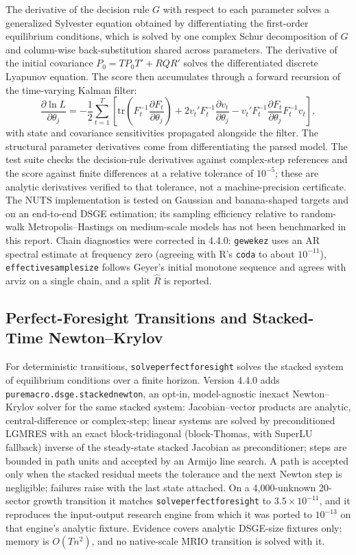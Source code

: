 \documentclass[11pt,letterpaper]{article}
\renewcommand{\_}{\pmunderscore\allowbreak}
\begin{document}
The derivative of the decision rule \(G\) with respect to each parameter solves a generalized Sylvester equation obtained by differentiating the first-order equilibrium conditions, which is solved by one complex Schur decomposition of \(G\) and column-wise back-substitution shared across parameters. The derivative of the initial covariance \(P_0 = T P_0 T' + R Q R'\) solves the differentiated discrete Lyapunov equation. The score then accumulates through a forward recursion of the time-varying Kalman filter:
\[\frac{\partial \ln L}{\partial \theta_j} = -\frac{1}{2} \sum_{t=1}^T \left[ \text{tr}\left( F_t^{-1} \frac{\partial F_t}{\partial \theta_j} \right) + 2 v_t' F_t^{-1} \frac{\partial v_t}{\partial \theta_j} - v_t' F_t^{-1} \frac{\partial F_t}{\partial \theta_j} F_t^{-1} v_t \right],\]
with state and covariance sensitivities propagated alongside the filter. The structural parameter derivatives come from differentiating the parsed model. The test suite checks the decision-rule derivatives against complex-step references and the score against finite differences at a relative tolerance of \(10^{-5}\); these are analytic derivatives verified to that tolerance, not a machine-precision certificate. The NUTS implementation is tested on Gaussian and banana-shaped targets and on an end-to-end DSGE estimation; its sampling efficiency relative to random-walk Metropolis--Hastings on medium-scale models has not been benchmarked in this report. Chain diagnostics were corrected in 4.4.0: \texttt{geweke\_z} uses an AR spectral estimate at frequency zero (agreeing with R's \texttt{coda} to about \(10^{-11}\)), \texttt{effective\_sample\_size} follows Geyer's initial monotone sequence and agrees with arviz on a single chain, and a split \(\hat R\) is reported.

\subsection{Perfect-Foresight Transitions and Stacked-Time Newton--Krylov}\label{perfect-foresight-transitions-and-stacked-time-newtonkrylov}

For deterministic transitions, \texttt{solve\_perfect\_foresight} solves the stacked system of equilibrium conditions over a finite horizon. Version 4.4.0 adds \texttt{puremacro.dsge.stacked\_newton}, an opt-in, model-agnostic inexact Newton--Krylov solver for the same stacked system: Jacobian--vector products are analytic, central-difference or complex-step; linear systems are solved by preconditioned LGMRES with an exact block-tridiagonal (block-Thomas, with SuperLU fallback) inverse of the steady-state stacked Jacobian as preconditioner; steps are bounded in path units and accepted by an Armijo line search. A path is accepted only when the stacked residual meets the tolerance and the next Newton step is negligible; failures raise with the last state attached. On a 4,000-unknown 20-sector growth transition it matches \texttt{solve\_perfect\_foresight} to \(3.5\times10^{-11}\), and it reproduces the input-output research engine from which it was ported to \(10^{-13}\) on that engine's analytic fixture. Evidence covers analytic DSGE-size fixtures only; memory is \(O(T n^2)\), and no native-scale MRIO transition is solved with it.
\end{document}
